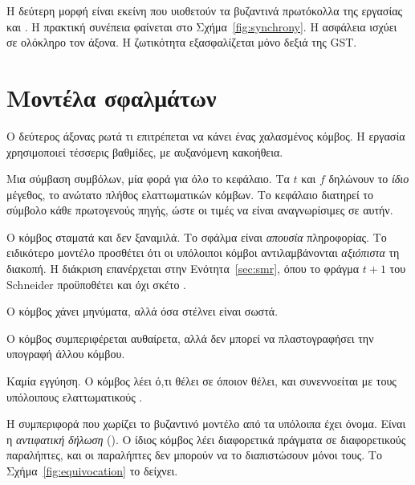 Η δεύτερη μορφή είναι εκείνη που υιοθετούν τα βυζαντινά πρωτόκολλα της
εργασίας \cite{yin2019hotstuff} και \cite{malkhi2023hotstuff2}\prep. Η
πρακτική συνέπεια φαίνεται στο Σχήμα~\ref{fig:synchrony}. Η ασφάλεια
ισχύει σε ολόκληρο τον άξονα. Η ζωτικότητα εξασφαλίζεται μόνο δεξιά της
GST.

\section{Μοντέλα σφαλμάτων}
\label{sec:faults}

Ο δεύτερος άξονας ρωτά τι επιτρέπεται να κάνει ένας χαλασμένος κόμβος. Η
εργασία χρησιμοποιεί τέσσερις βαθμίδες, με αυξανόμενη κακοήθεια.

Μια σύμβαση συμβόλων, μία φορά για όλο το κεφάλαιο. Τα $t$ και $f$
δηλώνουν το \emph{ίδιο} μέγεθος, το ανώτατο πλήθος ελαττωματικών κόμβων.
Το κεφάλαιο διατηρεί το σύμβολο κάθε πρωτογενούς πηγής, ώστε οι τιμές να
είναι αναγνωρίσιμες σε αυτήν.

\begin{description}[leftmargin=2.2em,style=nextline,font=\normalfont\bfseries]
  \item[Κατάρρευση (\en{crash}).] Ο κόμβος σταματά και δεν ξαναμιλά. Το
  σφάλμα είναι \emph{απουσία} πληροφορίας. Το ειδικότερο μοντέλο
   προσθέτει ότι οι υπόλοιποι κόμβοι αντιλαμβάνονται
  \emph{αξιόπιστα} τη διακοπή. Η διάκριση επανέρχεται στην
  Ενότητα~\ref{sec:smr}, όπου το φράγμα $t{+}1$ του Schneider
  προϋποθέτει  και όχι σκέτο .
  \item[Παραλείψεις (\en{omission}).] Ο κόμβος χάνει μηνύματα, αλλά όσα
  στέλνει είναι σωστά.
  \item[Βυζαντινό με αυθεντικοποίηση.] Ο κόμβος συμπεριφέρεται αυθαίρετα,
  αλλά δεν μπορεί να πλαστογραφήσει την υπογραφή άλλου κόμβου.
  \item[Βυζαντινό χωρίς αυθεντικοποίηση.] Καμία εγγύηση. Ο κόμβος λέει
  ό,τι θέλει σε όποιον θέλει, και συνεννοείται με τους υπόλοιπους
  ελαττωματικούς \cite{lamport1982byzantine}.
\end{description}

Η συμπεριφορά που χωρίζει το βυζαντινό μοντέλο από τα υπόλοιπα έχει
όνομα. Είναι η \emph{αντιφατική δήλωση} (). Ο ίδιος
κόμβος λέει διαφορετικά πράγματα σε διαφορετικούς παραλήπτες, και οι
παραλήπτες δεν μπορούν να το διαπιστώσουν μόνοι τους. Το
Σχήμα~\ref{fig:equivocation} το δείχνει.


